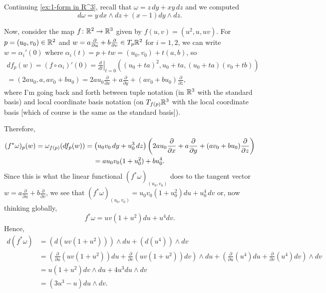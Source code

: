 \begin{example}
	Continuing \cref{ex:1-form in R^3}, recall that $\omega = z \, dy + xy \, dz$ and we computed 
	\[
		d\omega = y\, dx \wedge dz + (x-1) dy \wedge dz.
	\]
	
	Now, consider the map $f \colon\thinspace\! \mathbb{R}^2 \to \mathbb{R}^3$ given by $f(u,v) = (u^2, u, uv)$. For $p = (u_0, v_0) \in \mathbb{R}^2$ and $w = a \frac{\partial}{\partial u} + b \frac{\partial }{\partial v} \in T_p\mathbb{R}^2$ for $i=1,2$, we can write $w = \alpha_i'(0)$ where $\alpha_i(t) = p + tw = (u_0 , v_0) + t(a,b)$, so 
	\begin{multline*}
		df_p(w) = (f \circ \alpha_i)'(0) = \left. \frac{d}{dt}\right|_{t=0} ((u_0 + ta)^2, u_0 + ta, (u_0 + ta)(v_0 + tb)) \\
		= (2au_0, a, av_0 + bu_0) = 2au_0 \frac{\partial}{\partial x} + a \frac{\partial}{\partial y} + (av_0 + bu_0) \frac{\partial}{\partial z},
	\end{multline*}
	where I'm going back and forth between tuple notation (in $\mathbb{R}^3$ with the standard basis) and local coordinate basis notation (on $T_{f(p)} \mathbb{R}^3$ with the local coordinate basis [which of course is the same as the standard basis]). 
	
	Therefore,
	\begin{multline*}
		(f^\ast \omega)_p(w) = \omega_{f(p)}(df_p(w)) = \left(\vphantom{x^2} u_0v_0 \, dy + u_0^3 \, dz\right)\left(2au_0 \frac{\partial}{\partial x} + a \frac{\partial}{\partial y} + (av_0 + bu_0) \frac{\partial}{\partial z}\right) \\
		= a u_0 v_0(1+u_0^2) + b u_0^4.
	\end{multline*}
	Since this is what the linear functional $(f^\ast \omega)_{(u_0,v_0)}$ does to the tangent vector $w=a \frac{\partial}{\partial u} + b \frac{\partial }{\partial v}$, we see that $(f^\ast \omega)_{(u_0,v_0)} = u_0 v_0(1+u_0^2) du + u_0^4\, dv$ or, now thinking globally,
	\[
		f^\ast \omega = u v(1+u^2) du + u^4 dv.
	\]
	Hence,
	\begin{align*}
		d(f^\ast \omega) & = \left(d\left( u v(1+u^2) \right)\right) \wedge du + \left(d\left(u^4 \right)\right)\wedge dv \\
		 & = \left( \frac{\partial}{\partial u}\left( u v(1+u^2) \right) du + \frac{\partial}{\partial v}\left( u v(1+u^2) \right) dv\right) \wedge du + \left( \frac{\partial}{\partial u}\left(u^4\right) du + \frac{\partial}{\partial v}\left(u^4\right)dv \right) \wedge dv \\
		 & = u(1+u^2) dv \wedge du + 4u^3 du \wedge dv \\
		 & = (3u^3-u) du \wedge dv.
	\end{align*}
	

\end{example}
